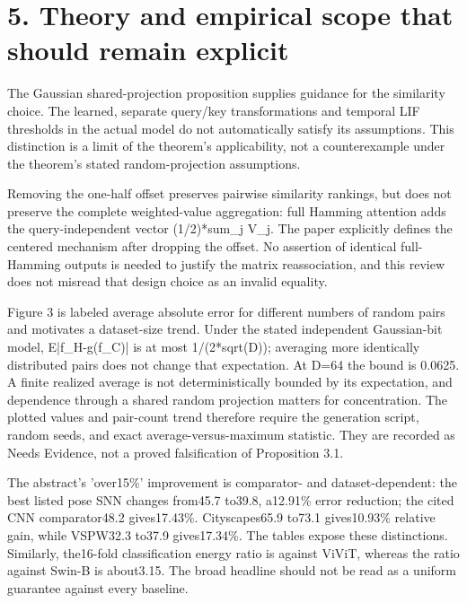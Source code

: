 \documentclass[10pt]{article}
\begin{document}
\section*{5. Theory and empirical scope that should remain explicit}
The Gaussian shared-projection proposition supplies guidance for the similarity choice. The learned, separate query/key transformations and temporal LIF thresholds in the actual model do not automatically satisfy its assumptions. This distinction is a limit of the theorem’s applicability, not a counterexample under the theorem’s stated random-projection assumptions.\par
Removing the one-half offset preserves pairwise similarity rankings, but does not preserve the complete weighted-value aggregation: full Hamming attention adds the query-independent vector (1/2)*sum\_j V\_j. The paper explicitly defines the centered mechanism after dropping the offset. No assertion of identical full-Hamming outputs is needed to justify the matrix reassociation, and this review does not misread that design choice as an invalid equality.\par
Figure 3 is labeled average absolute error for different numbers of random pairs and motivates a dataset-size trend. Under the stated independent Gaussian-bit model, E|f\_H-g(f\_C)| is at most 1/(2*sqrt(D)); averaging more identically distributed pairs does not change that expectation. At D=64 the bound is 0.0625. A finite realized average is not deterministically bounded by its expectation, and dependence through a shared random projection matters for concentration. The plotted values and pair-count trend therefore require the generation script, random seeds, and exact average-versus-maximum statistic. They are recorded as Needs Evidence, not a proved falsification of Proposition 3.1.\par
The abstract’s ’over15\%’ improvement is comparator- and dataset-dependent: the best listed pose SNN changes from45.7 to39.8, a12.91\% error reduction; the cited CNN comparator48.2 gives17.43\%. Cityscapes65.9 to73.1 gives10.93\% relative gain, while VSPW32.3 to37.9 gives17.34\%. The tables expose these distinctions. Similarly, the16-fold classification energy ratio is against ViViT, whereas the ratio against Swin-B is about3.15. The broad headline should not be read as a uniform guarantee against every baseline.\par
\end{document}
